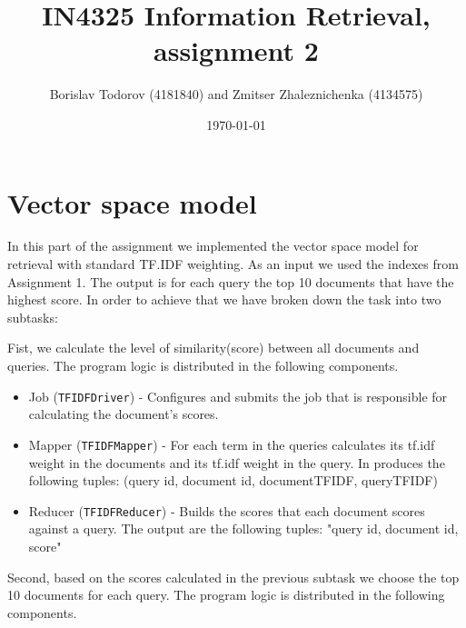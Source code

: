 \documentclass[a4paper, notitlepage]{article}
\begin{document}
\title{IN4325 Information Retrieval, assignment 2}
\author{Borislav Todorov (4181840) and Zmitser Zhaleznichenka (4134575)}
\date{\today}
\maketitle

\section{Vector space model}
In this part of the assignment we implemented the vector space model for retrieval with standard TF.IDF weighting. As an input we used the indexes from Assignment 1. The output is for each query the top 10 documents that have the highest score. In order to achieve that we have broken down the task into two subtasks:

Fist, we calculate the level of similarity(score) between all documents and queries. The program logic is distributed in the following components.

\begin{itemize}
	\item Job (\lstinline{TFIDFDriver}) - Configures and submits the job that is responsible for calculating the document's scores.
	\item Mapper (\lstinline{TFIDFMapper}) - For each term in the queries calculates its tf.idf weight in the documents and its tf.idf weight in the query. In produces the following tuples: (query id, document id, documentTFIDF, queryTFIDF)
	\item Reducer (\lstinline{TFIDFReducer}) - Builds the scores that each document scores against a query. The output are the following tuples: "query id, document id, score"  
\end{itemize}

Second, based on the scores calculated in the previous subtask we choose the top 10 documents for each query. The program logic is distributed in the following components.
\end{document}
